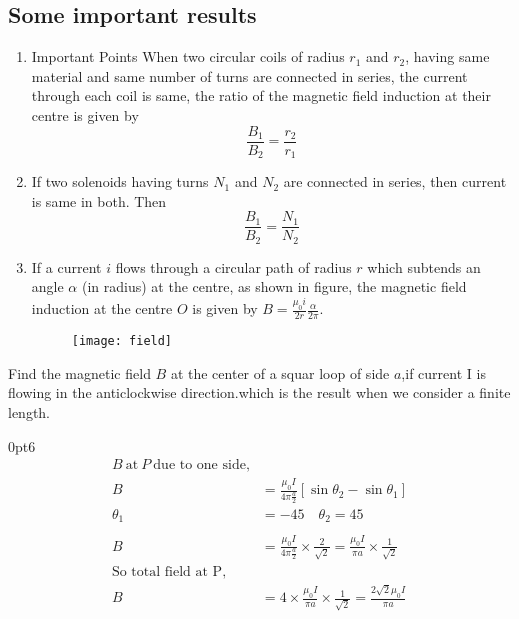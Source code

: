 \subsection{Some important results}
\begin{enumerate}
	\item Important Points
	When two circular coils of radius $r_{1}$ and $r_{2}$, having same material and same number of turns are connected in series, the current through each coil is same, the ratio of the magnetic field induction at their centre is given by
	$$
	\frac{B_{1}}{B_{2}}=\frac{r_{2}}{r_{1}}
	$$
	\item If two solenoids having turns $N_{1}$ and $N_{2}$ are connected in series, then current is same in both. Then
	$$
	\frac{B_{1}}{B_{2}}=\frac{N_{1}}{N_{2}}
	$$
	\item If a current $i$ flows through a circular path of radius $r$ which subtends an angle $\alpha$ (in radius) at the centre, as shown in figure, the magnetic field induction at the centre $O$ is given by $B=\frac{\mu_{0}i}{2r} \frac{\alpha }{2\pi}$.
		\begin{figure}[H]
		\begin{center}
			\texttt{[image: field]}
		\end{center}
	\end{figure}
\end{enumerate}
\begin{exercise}
	Find the magnetic field $B$ at the center of a squar loop of side $a$,if current I is flowing in the anticlockwise direction.which is the result when we consider a finite length.
\end{exercise}
\opencutright
\renewcommand\windowpagestuff{
	\centering\texttt{[image: diagram-20210417(9)-crop]}}
\begin{answer}
	\vspace{1cm}
	\begin{cutout}{3}{\dimexpr\linewidth-6cm\relax}{0pt}{6}
		\begin{align*}
		B\ \text{at}\  P\ \text{due to one side,}\\
		B&=\frac{\mu_0I}{4\pi \frac{a}{2}}[\sin\theta_2-\sin\theta_1]\\
		\theta_1&=-45 \quad \theta_2=45\\\\
		B&=\frac{\mu_0I}{4\pi \frac{a}{2}}\times\frac{2}{\sqrt{2}}=\frac{\mu_0I}{\pi a}\times\frac{1}{\sqrt{2}}\\
		\text{So total field at P,}\\
		B&= 4\times\frac{\mu_0I}{\pi a} \times \frac{1}{\sqrt{2}}=\frac{2\sqrt{2}\mu_0I}{\pi a}
		\end{align*}
	\end{cutout}
\end{answer}


